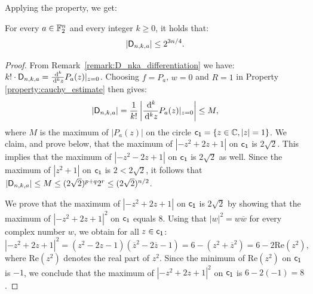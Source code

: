 \documentclass[11pt]{llncs}
\begin{document}




Applying the property, we get:

\begin{theorem}\label{theorem:bound_D_nka}
    For every $a\in\mathbb{F}_2^n$ and every integer $k\geq 0$, it holds that:
    \[
        |\mathsf{D}_{n,k,a}|\leq 2^{3n/4}.
    \]
\end{theorem}

\begin{proof}
    From Remark~\ref{remark:D_nka_differentiation} we have: $k!\cdot\mathsf{D}_{n,k,a}=\frac{\,\mathrm d^k}{\,\mathrm d^k z}P_a(z)\vert_{z=0}$. Choosing $f=P_a$, $w=0$ and $R=1$ in Property \ref{property:cauchy_estimate} then gives:
    \[
        |\mathsf{D}_{n,k,a}|=\frac{1}{k!}\left|\frac{\,\mathrm d^k}{\,\mathrm d^k z}P_a(z)\vert_{z=0}\right|\leq M,
    \]
    where $M$ is the maximum of $|P_a(z)|$ on the circle %
    $\mathsf{c_1}=\{ z \in \mathbb{C},  |z|=1  \}$.
    We claim, and prove below, that the maximum of $\left|-z^2+2z+1\right|$ on $\mathsf{c_1}$ is $2\sqrt 2$. 
    This implies that the maximum of $\left|-z^2-2z+1\right|$ on $\mathsf{c_1}$ is $2\sqrt 2$ as well. 
    Since the maximum of $\left|z^2+1\right|$ on $\mathsf{c_1}$ is $2<2\sqrt 2$, it follows that $|\mathsf{D}_{n,k,a}|\leq M\leq (2\sqrt 2)^{p+q}2^r\leq (2\sqrt 2)^{n/2}$.

	We prove that the maximum of $\left|-z^2+2z+1\right|$ on $\mathsf{c_1}$ is $2\sqrt 2$ by showing that the maximum of $\left|-z^2+2z+1\right|^2$ on $\mathsf{c_1}$ equals $8$.
    Using that $|w|^2=w\overline w$ for every complex number $w$, we obtain for all $z\in \mathsf{c_1}$:
    \[
        \left|-z^2+2z+1\right|^2=\left(z^2-2z-1\right)\left(\overline z^2-2\overline z-1\right)=6-\left(z^2+\overline z^2\right)=6-2\mathrm{Re}\left(z^2\right),
    \]
    where $\mathrm{Re}\left(z^2\right)$ denotes the real part of $z^2$. Since the minimum of $\mathrm{Re}\left(z^2\right)$ on $\mathsf{c_1}$ is $-1$, we conclude that the maximum of $\left|-z^2+2z+1\right|^2$ on $\mathsf{c_1}$ is $6-2(-1)=8$. 
     
    
\end{proof}
\end{document}
